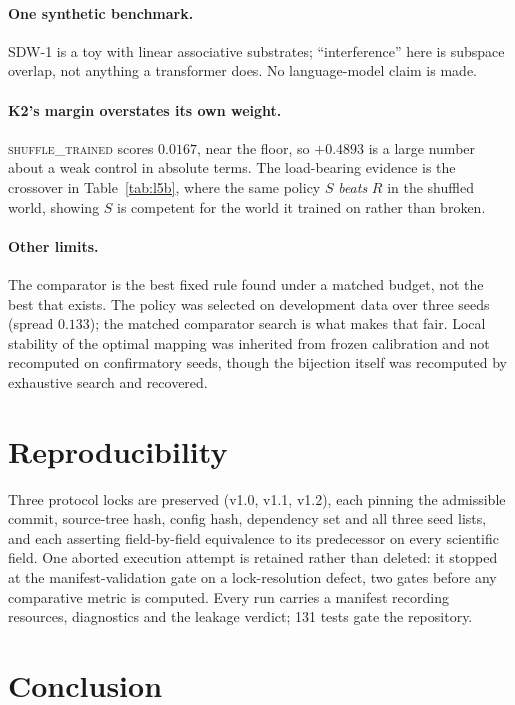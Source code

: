 \documentclass[11pt]{article}
\begin{document}
\paragraph{One synthetic benchmark.} SDW-1 is a toy with linear associative
substrates; ``interference'' here is subspace overlap, not anything a
transformer does. No language-model claim is made.

\paragraph{K2's margin overstates its own weight.} \textsc{shuffle\_trained}
scores $0.0167$, near the floor, so $+0.4893$ is a large number about a weak
control in absolute terms. The load-bearing evidence is the crossover in
Table~\ref{tab:l5b}, where the same policy $S$ \emph{beats} $R$ in the shuffled
world, showing $S$ is competent for the world it trained on rather than broken.

\paragraph{Other limits.} The comparator is the best fixed rule found under a
matched budget, not the best that exists. The policy was selected on development
data over three seeds (spread $0.133$); the matched comparator search is what
makes that fair. Local stability of the optimal mapping was inherited from
frozen calibration and not recomputed on confirmatory seeds, though the
bijection itself was recomputed by exhaustive search and recovered.

\section{Reproducibility}

Three protocol locks are preserved (v1.0, v1.1, v1.2), each pinning the
admissible commit, source-tree hash, config hash, dependency set and all three
seed lists, and each asserting field-by-field equivalence to its predecessor on
every scientific field. One aborted execution attempt is retained rather than
deleted: it stopped at the manifest-validation gate on a lock-resolution defect,
two gates before any comparative metric is computed. Every run carries a
manifest recording resources, diagnostics and the leakage verdict; 131 tests
gate the repository.

\section{Conclusion}
\end{document}
